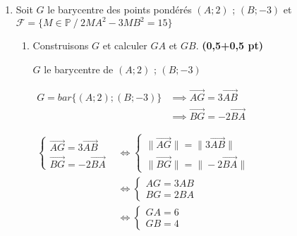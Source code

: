 \documentclass[12pt,a4paper]{article}
\begin{document}
\begin{enumerate}
\begin{enumerate}
\begin{center}
                    \end{center}


          \end{enumerate}

    \item Soit \( G \) le barycentre des points pondérés \( (A ; 2) \) ; \( (B ; -3) \) et \( \mathcal{F} = \{ M \in \mathbb{P} \ / \ 2MA^2 - 3MB^2 = 15 \} \)
          \begin{enumerate}
              \item Construisons \( G \) et calculer \( GA \) et \( GB \). \hfill \textbf{(0,5+0,5 pt)}

                    \( G \) le barycentre de \( (A ; 2) \) ; \( (B ; -3) \)

                    \(
                    \begin{aligned}
                        G =bar\{ (A ; 2) ; (B ; -3) \} & \implies \overrightarrow{AG} = 3 \overrightarrow{AB}  \\
                                                       & \implies \overrightarrow{BG} = -2 \overrightarrow{BA}
                    \end{aligned}
                    \)

                    \(
                    \begin{aligned}
                        \begin{cases}
                            \overrightarrow{AG} = 3 \overrightarrow{AB} \\
                            \overrightarrow{BG} = -2 \overrightarrow{BA}
                        \end{cases} & \iff
                        \begin{cases}
                            \| \overrightarrow{AG} \| =\| 3 \overrightarrow{AB}\| \\
                            \| \overrightarrow{BG} \|=\| -2 \overrightarrow{BA}\|
                        \end{cases} \\&\iff
                        \begin{cases}
                            AG = 3 AB \\
                            BG = 2 BA
                        \end{cases}                                          \\&\iff
                        \begin{cases}
                            GA = 6 \\
                            GB = 4
                        \end{cases}
                    \end{aligned}
                    \)


\end{enumerate}
\end{enumerate}
\end{document}
